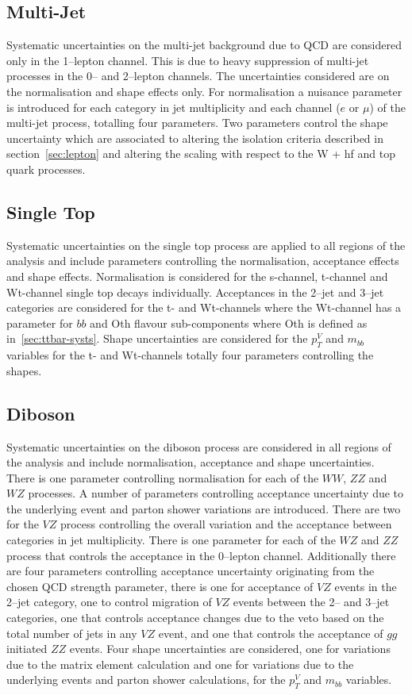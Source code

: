 \subsection{Multi-Jet}
Systematic uncertainties on the multi-jet background due to QCD are considered
only in the 1--lepton channel. This is due to heavy suppression of multi-jet
processes in the 0-- and 2--lepton channels. The uncertainties considered are on
the normalisation and shape effects only. For normalisation a nuisance parameter
is introduced for each category in jet multiplicity and each channel ($e$ or
$\mu$) of the multi-jet process, totalling four parameters. Two parameters
control the shape uncertainty which are associated to altering the isolation
criteria described in section~\ref{sec:lepton} and altering the scaling with
respect to the W + hf and top quark processes. 

\subsection{Single Top}
Systematic uncertainties on the single top process are applied to all regions of
the analysis and include parameters controlling the normalisation, acceptance
effects and shape effects. Normalisation is considered for the s-channel,
t-channel and Wt-channel single top decays individually. Acceptances in the
2--jet and 3--jet categories are considered for the t- and Wt-channels where the
Wt-channel has a parameter for $bb$ and Oth flavour sub-components where Oth is
defined as in~\ref{sec:ttbar-systs}. Shape uncertainties are considered for the
$p_T^V$ and $m_{bb}$ variables for the t- and Wt-channels totally four
parameters controlling the shapes.

\subsection{Diboson}
Systematic uncertainties on the diboson process are considered in all regions of
the analysis and include normalisation, acceptance and shape uncertainties.
There is one parameter controlling normalisation for each of the $WW$, $ZZ$ and
$WZ$ processes. A number of parameters controlling acceptance uncertainty due to
the underlying event and parton shower variations are introduced. There are two
for the $VZ$ process controlling the overall variation and the acceptance
between categories in jet multiplicity. There is one parameter for each of the
$WZ$ and $ZZ$ process that controls the acceptance in the 0--lepton channel.
Additionally there are four parameters controlling acceptance uncertainty
originating from the chosen QCD strength parameter, there is one for acceptance
of $VZ$ events in the 2--jet category, one to control migration of $VZ$ events
between the 2-- and 3--jet categories, one that controls acceptance changes due
to the veto based on the total number of jets in any $VZ$ event, and one that
controls the acceptance of $gg$ initiated $ZZ$ events. Four shape uncertainties
are considered, one for variations due to the matrix element calculation and one
for variations due to the underlying events and parton shower calculations, for
the $p_T^V$ and $m_{bb}$ variables.

